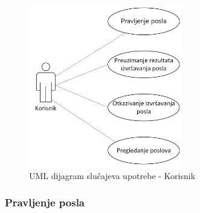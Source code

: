 \documentclass[12pt,oneside]{memoir}
\begin{document}
\begin{figure}[!ht]
  \centering
  \includegraphics[width=0.6\textwidth]{./images/dijagram_slucajeva_upotrebe_korisnik.png}
  \caption{UML dijagram slučajeva upotrebe - Korisnik}
  \label{fig:slucajupotrebe_korisnik}
\end{figure}

\subsubsection{Pravljenje posla}
\end{document}

